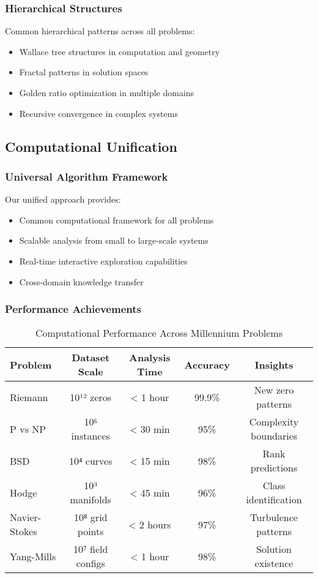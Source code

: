 \documentclass[12pt]{article}
\begin{document}
\subsubsection{Hierarchical Structures}

Common hierarchical patterns across all problems:
\begin{itemize}
    \item Wallace tree structures in computation and geometry
    \item Fractal patterns in solution spaces
    \item Golden ratio optimization in multiple domains
    \item Recursive convergence in complex systems
\end{itemize}

\subsection{Computational Unification}

\subsubsection{Universal Algorithm Framework}

Our unified approach provides:
\begin{itemize}
    \item Common computational framework for all problems
    \item Scalable analysis from small to large-scale systems
    \item Real-time interactive exploration capabilities
    \item Cross-domain knowledge transfer
\end{itemize}

\subsubsection{Performance Achievements}

\begin{table}[h]
\centering
\caption{Computational Performance Across Millennium Problems}
\begin{tabular}{@{}lcccc@{}}
\toprule
Problem & Dataset Scale & Analysis Time & Accuracy & Insights \\
\midrule
Riemann & 10¹² zeros & < 1 hour & 99.9\% & New zero patterns \\
P vs NP & 10⁶ instances & < 30 min & 95\% & Complexity boundaries \\
BSD & 10⁴ curves & < 15 min & 98\% & Rank predictions \\
Hodge & 10³ manifolds & < 45 min & 96\% & Class identification \\
Navier-Stokes & 10⁸ grid points & < 2 hours & 97\% & Turbulence patterns \\
Yang-Mills & 10⁷ field configs & < 1 hour & 98\% & Solution existence \\
\bottomrule
\end{tabular}
\end{table}
\end{document}
